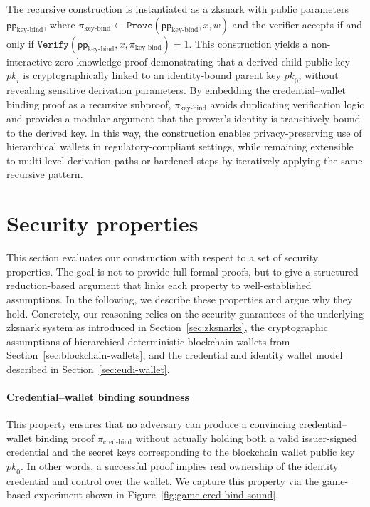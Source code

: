 \medskip
The recursive construction is instantiated as a \acrshort{zksnark} with public parameters $\mathsf{pp}_{\text{key-bind}}$, where $\pi_{\text{key-bind}} \leftarrow \texttt{Prove}(\mathsf{pp}_{\text{key-bind}}, x, w)$ and the verifier accepts if and only if $\texttt{Verify}(\mathsf{pp}_{\text{key-bind}}, x, \pi_{\text{key-bind}}) = 1$. This construction yields a non-interactive zero-knowledge proof demonstrating that a derived child public key $\mathit{pk}_i$ is cryptographically linked to an identity-bound parent key $\mathit{pk}_0$, without revealing sensitive derivation parameters. By embedding the credential–wallet binding proof as a recursive subproof, $\pi_{\text{key-bind}}$ avoids duplicating verification logic and provides a modular argument that the prover’s identity is transitively bound to the derived key. In this way, the construction enables privacy-preserving use of hierarchical wallets in regulatory-compliant settings, while remaining extensible to multi-level derivation paths or hardened steps by iteratively applying the same recursive pattern.

\section{Security properties}
\label{sec:security-properties}
This section evaluates our construction with respect to a set of security properties. The goal is not to provide full formal proofs, but to give a structured reduction-based argument that links each property to well-established assumptions. In the following, we describe these properties and argue why they hold. Concretely, our reasoning relies on the security guarantees of the underlying \acrshort{zksnark} system as introduced in Section~\ref{sec:zksnarks}, the cryptographic assumptions of hierarchical deterministic blockchain wallets from Section~\ref{sec:blockchain-wallets}, and the credential and identity wallet model described in Section~\ref{sec:eudi-wallet}.

\paragraph{Credential–wallet binding soundness}
This property ensures that no adversary can produce a convincing credential–wallet binding proof $\pi_{\text{cred-bind}}$ without actually holding both a valid issuer-signed credential and the secret keys corresponding to the blockchain wallet public key $\mathit{pk}_0$. In other words, a successful proof implies real ownership of the identity credential and control over the wallet. We capture this property via the game-based experiment shown in Figure~\ref{fig:game-cred-bind-sound}.

